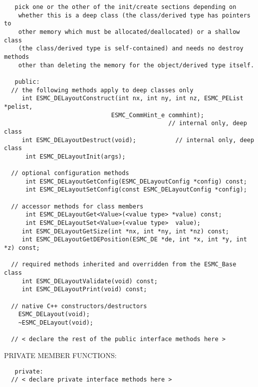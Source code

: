 \begin{verbatim}   pick one or the other of the init/create sections depending on
    whether this is a deep class (the class/derived type has pointers to
    other memory which must be allocated/deallocated) or a shallow class
    (the class/derived type is self-contained) and needs no destroy methods
    other than deleting the memory for the object/derived type itself.
 
   public:
  // the following methods apply to deep classes only
     int ESMC_DELayoutConstruct(int nx, int ny, int nz, ESMC_PEList *pelist,
                              ESMC_CommHint_e commhint); 
                                              // internal only, deep class
     int ESMC_DELayoutDestruct(void);           // internal only, deep class
      int ESMC_DELayoutInit(args);
 
  // optional configuration methods
      int ESMC_DELayoutGetConfig(ESMC_DELayoutConfig *config) const;
      int ESMC_DELayoutSetConfig(const ESMC_DELayoutConfig *config);
 
  // accessor methods for class members
      int ESMC_DELayoutGet<Value>(<value type> *value) const;
      int ESMC_DELayoutSet<Value>(<value type>  value);
     int ESMC_DELayoutGetSize(int *nx, int *ny, int *nz) const;
     int ESMC_DELayoutGetDEPosition(ESMC_DE *de, int *x, int *y, int *z) const;
     
  // required methods inherited and overridden from the ESMC_Base class
     int ESMC_DELayoutValidate(void) const;
     int ESMC_DELayoutPrint(void) const;
 
  // native C++ constructors/destructors
 	ESMC_DELayout(void);
 	~ESMC_DELayout(void);
   
  // < declare the rest of the public interface methods here >
   \end{verbatim}{\sf PRIVATE MEMBER FUNCTIONS:}
\begin{verbatim}   private: 
  // < declare private interface methods here >\end{verbatim}

